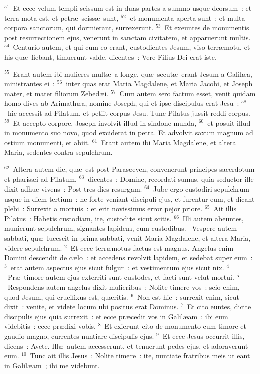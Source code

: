 ${}^{51}$~Et ecce velum templi scissum est in duas partes a summo usque deorsum~: et terra mota est, et petr\ae\ sciss\ae\ sunt,
${}^{52}$~et monumenta aperta sunt~: et multa corpora sanctorum, qui dormierant, surrexerunt.
${}^{53}$~Et exeuntes de monumentis post resurrectionem ejus, venerunt in sanctam civitatem, et apparuerunt multis.
${}^{54}$~Centurio autem, et qui cum eo erant, custodientes Jesum, viso terr\ae motu, et his qu\ae\ fiebant, timuerunt valde, dicentes~: Vere Filius Dei erat iste.


${}^{55}$~Erant autem ibi mulieres mult\ae\ a longe, qu\ae\ secut\ae\ erant Jesum a Galil\ae a, ministrantes ei~:
${}^{56}$~inter quas erat Maria Magdalene, et Maria Jacobi, et Joseph mater, et mater filiorum Zebed\ae i.
${}^{57}$~Cum autem sero factum esset, venit quidam homo dives ab Arimath\ae a, nomine Joseph, qui et ipse discipulus erat Jesu~:
${}^{58}$~hic accessit ad Pilatum, et petiit corpus Jesu. Tunc Pilatus jussit reddi corpus.
${}^{59}$~Et accepto corpore, Joseph involvit illud in sindone munda,
${}^{60}$~et posuit illud in monumento suo novo, quod exciderat in petra. Et advolvit saxum magnum ad ostium monumenti, et abiit.
${}^{61}$~Erant autem ibi Maria Magdalene, et altera Maria, sedentes contra sepulchrum.


${}^{62}$~Altera autem die, qu\ae\ est post Parasceven, convenerunt principes sacerdotum et pharis\ae i ad Pilatum,
${}^{63}$~dicentes~: Domine, recordati sumus, quia seductor ille dixit adhuc vivens~: Post tres dies resurgam.
${}^{64}$~Jube ergo custodiri sepulchrum usque in diem tertium~: ne forte veniant discipuli ejus, et furentur eum, et dicant plebi~: Surrexit a mortuis~: et erit novissimus error pejor priore.
${}^{65}$~Ait illis Pilatus~: Habetis custodiam, ite, custodite sicut scitis.
${}^{66}$~Illi autem abeuntes, munierunt sepulchrum, signantes lapidem, cum custodibus.
~Vespere autem sabbati, qu\ae\ lucescit in prima sabbati, venit Maria Magdalene, et altera Maria, videre sepulchrum.
${}^{2}$~Et ecce terr\ae motus factus est magnus. Angelus enim Domini descendit de c\ae lo~: et accedens revolvit lapidem, et sedebat super eum~:
${}^{3}$~erat autem aspectus ejus sicut fulgur~: et vestimentum ejus sicut nix.
${}^{4}$~Pr\ae\ timore autem ejus exterriti sunt custodes, et facti sunt velut mortui.
${}^{5}$~Respondens autem angelus dixit mulieribus~: Nolite timere vos~: scio enim, quod Jesum, qui crucifixus est, qu\ae ritis.
${}^{6}$~Non est hic~: surrexit enim, sicut dixit~: venite, et videte locum ubi positus erat Dominus.
${}^{7}$~Et cito euntes, dicite discipulis ejus quia surrexit~: et ecce pr\ae cedit vos in Galil\ae am~: ibi eum videbitis~: ecce pr\ae dixi vobis.
${}^{8}$~Et exierunt cito de monumento cum timore et gaudio magno, currentes nuntiare discipulis ejus.
${}^{9}$~Et ecce Jesus occurrit illis, dicens~: Avete. Ill\ae\ autem accesserunt, et tenuerunt pedes ejus, et adoraverunt eum.
${}^{10}$~Tunc ait illis Jesus~: Nolite timere~: ite, nuntiate fratribus meis ut eant in Galil\ae am~; ibi me videbunt.


